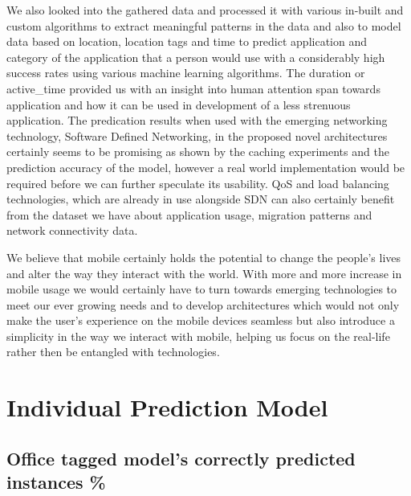 \documentclass[prodmode,acmtecs]{acmsmall}
\begin{document}
We also looked into the gathered data and processed it with various in-built and custom algorithms to extract meaningful patterns in the data and also to model data based on location, location tags and time to predict application and category of the application that a person would use with a considerably high success rates using various machine learning algorithms. The duration or active\_time provided us with an insight into human attention span towards application and how it can be used in development of a less strenuous application. The predication results when used with the emerging networking technology, Software Defined Networking, in the proposed novel architectures certainly seems to be promising as shown by the  caching experiments and the prediction accuracy of the model, however a real world implementation would be required before we can further speculate its usability. QoS and load balancing technologies,     which are already in use alongside SDN can also certainly benefit from the dataset we have about application usage, migration patterns and network connectivity data.

We believe that mobile certainly holds the potential to change the people's lives and alter the way they interact with the world. With more and more increase in mobile usage we would certainly have to turn towards emerging technologies to meet our ever growing needs and to develop architectures which would not only make the user's experience on the mobile devices seamless but also introduce a simplicity in the way we interact with mobile, helping us focus on the real-life rather then be entangled with technologies.





\elecappendix

\medskip

\section{Individual Prediction Model}

\subsection{Office tagged model's correctly predicted instances \%}
\label{APX:individual}
\end{document}
